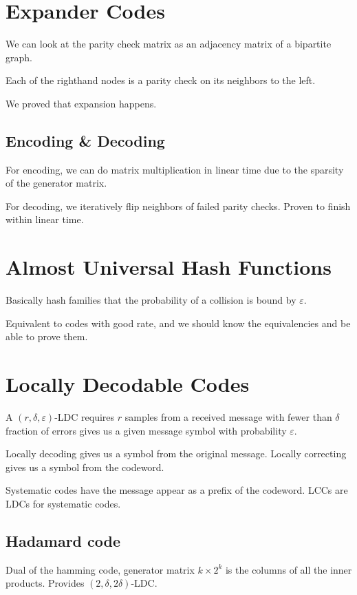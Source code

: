 \documentclass{idc_msc}
\begin{document}
\section{Expander Codes}

We can look at the parity check matrix as an adjacency matrix of a bipartite graph.

Each of the righthand nodes is a parity check on its neighbors to the left.

We proved that expansion happens.

\subsection{Encoding \& Decoding}

For encoding, we can do matrix multiplication in linear time due to the sparsity of the generator matrix.

For decoding, we iteratively flip neighbors of failed parity checks.
Proven to finish within linear time.

\section{Almost Universal Hash Functions}

Basically hash families that the probability of a collision is bound by \(\varepsilon\).

Equivalent to codes with good rate, and we should know the equivalencies and be able to prove them.

\section{Locally Decodable Codes}

A \((r,\delta, \varepsilon)\)-LDC requires \(r\) samples from a received message with fewer than \(\delta\) fraction of errors gives us a given message symbol with probability \(\varepsilon\).

Locally decoding gives us a symbol from the original message.
Locally correcting gives us a symbol from the codeword.

Systematic codes have the message appear as a prefix of the codeword.
LCCs are LDCs for systematic codes.

\subsection{Hadamard code}

Dual of the hamming code, generator matrix \(k \times 2^k\) is the columns of all the inner products.
Provides \((2, \delta, 2\delta)\)-LDC.
\end{document}
